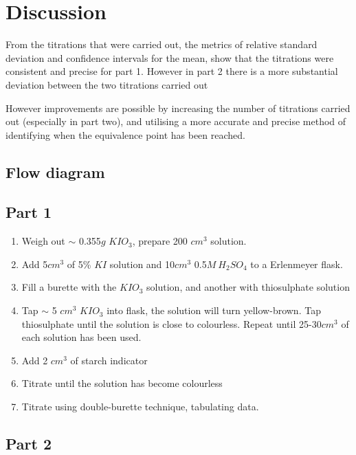 \documentclass[a4paper, british]{article}
\begin{document}
\section{Discussion}

From the titrations that were carried out, the metrics of relative standard deviation and confidence intervals for the mean, show that the titrations were consistent and precise for part 1. However in part 2 there is a more substantial deviation between the two titrations carried out 

However improvements are possible by increasing the number of titrations carried out (especially in part two), and utilising a more accurate and precise method of identifying when the equivalence point has been reached.

\newpage

\begin{appendices}

\section{Flow diagram}

\subsection*{Part 1}

\begin{enumerate}
    \item Weigh out \(\sim\) 0.355\(g\) \(KIO_3\), prepare 200 \(cm^3\) solution.
    \item Add 5\(cm^3\) of 5\% \(KI\) solution and 10\(cm^3\) 0.5\(M\ H_2SO_4\) to a Erlenmeyer flask.
    \item Fill a burette with the \(KIO_3\) solution, and another with thiosulphate solution
    \item Tap \(\sim\) 5 \(cm^3\) \(KIO_3\) into flask, the solution will turn yellow-brown. Tap thiosulphate until the solution is close to colourless. Repeat until 25-30\(cm^3\) of each solution has been used.
    \item Add 2 \(cm^3\) of starch indicator
    \item Titrate until the solution has become colourless
    \item Titrate using double-burette technique, tabulating data.
\end{enumerate}

\subsection*{Part 2}


\end{appendices}
\end{document}
